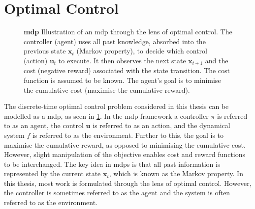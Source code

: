 \documentclass{mimosis-class/mimosis}
\numberwithin{equation}{chapter}
\newcommand{\state}{\ensuremath{\mathbf{x}}}
\newcommand{\control}{\ensuremath{\mathbf{u}}}
\begin{document}
\section{Optimal Control \label{sec-optimal-control}}
\label{sec:org08b8515}
\begin{figure}[!t]
\centering
{}
\caption[\acrfull{mdp}]{\textbf{\acrfull{mdp}} Illustration of an \acrshort{mdp} through the lens of optimal control. The controller (agent) uses all past knowledge, absorbed into the previous state $\state_t$ (Markov property), to decide which control (action) $\control_t$ to execute. It then observes the next state $\state_{t+1}$ and the cost (negative reward) associated with the state transition. The cost function is assumed to be known. The agent's goal is to minimise the cumulative cost (maximise the cumulative reward).}
\label{fig-mdp}
\end{figure}
The discrete-time optimal control problem considered in this thesis can be modelled as a
\acrfull{mdp}, as seen in \cref{fig-mdp}.
In the \acrshort{mdp} framework a controller \(\pi\) is referred to as an agent, the control \(\control\)
is referred to as an action, and the dynamical system \(f\) is referred to as the environment.
Further to this, the goal is to maximise the cumulative reward, as opposed to minimising the cumulative cost.
However, slight manipulation of the objective enables cost and reward functions to be interchanged.
The key idea in \acrshort{mdp}s is that all past information is represented by the current state \(\state_t\),
which is known as the Markov property.
In this thesis, most work is formulated through the lens of optimal control.
However, the controller is sometimes referred to as the agent and the system is often referred to
as the environment.
\end{document}
